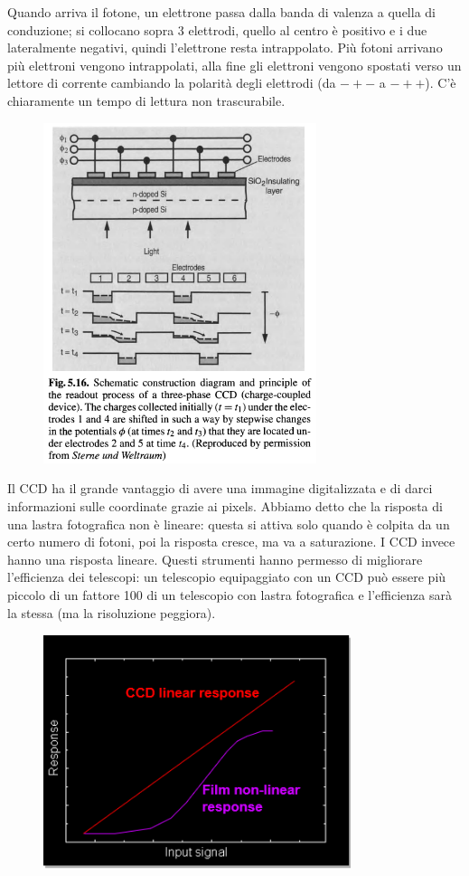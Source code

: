 \vspace{0.3cm}Quando arriva il fotone, un elettrone passa dalla banda di valenza a quella di conduzione; si collocano sopra 3 elettrodi, quello al centro è positivo e i due lateralmente negativi, quindi l'elettrone resta intrappolato. Più fotoni arrivano più elettroni vengono intrappolati, alla fine gli elettroni vengono spostati verso un lettore di corrente cambiando la polarità degli elettrodi (da $-+-$ a $-++$). C'è chiaramente un tempo di lettura non trascurabile.

\begin{figure}[H]
   \centering
   \includegraphics[width=8cm]{immagini/ccd.png}
\end{figure}

Il CCD ha il grande vantaggio di avere una immagine digitalizzata e di darci informazioni sulle coordinate grazie ai pixels. Abbiamo detto che la risposta di una lastra fotografica non è lineare: questa si attiva solo quando è colpita da un certo numero di fotoni, poi la risposta cresce, ma va a saturazione. I CCD invece hanno una risposta lineare. Questi strumenti hanno permesso di migliorare l'efficienza dei telescopi: un telescopio equipaggiato con un CCD può essere più piccolo di un fattore 100 di un telescopio con lastra fotografica e l'efficienza sarà la stessa (ma la risoluzione peggiora).

\begin{figure}[H]
   \centering
   \includegraphics[width=9cm]{astro5.png}
\end{figure}


